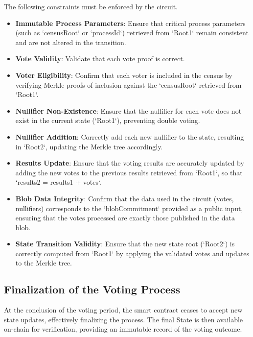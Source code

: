 \begin{figure}[H]
	\centering
\end{figure}

The following constraints must be enforced by the circuit.

\begin{itemize}
	\item \textbf{Immutable Process Parameters}: Ensure that critical process parameters (such as `censusRoot` or `processId`) retrieved from `Root1` remain consistent and are not altered in the transition.
	\item \textbf{Vote Validity}: Validate that each vote proof is correct.
	\item \textbf{Voter Eligibility}: Confirm that each voter is included in the census by verifying Merkle proofs of inclusion against the `censusRoot` retrieved from `Root1`.
	\item \textbf{Nullifier Non-Existence}: Ensure that the nullifier for each vote does not exist in the current state (`Root1`), preventing double voting.
	\item \textbf{Nullifier Addition}: Correctly add each new nullifier to the state, resulting in `Root2`, updating the Merkle tree accordingly.
	\item \textbf{Results Update}: Ensure that the voting results are accurately updated by adding the new votes to the previous results retrieved from `Root1`, so that `results2 = results1 + votes`.
	\item \textbf{Blob Data Integrity}: Confirm that the data used in the circuit (votes, nullifiers) corresponds to the `blobCommitment` provided as a public input, ensuring that the votes processed are exactly those published in the data blob.
	\item \textbf{State Transition Validity}: Ensure that the new state root (`Root2`) is correctly computed from `Root1` by applying the validated votes and updates to the Merkle tree.
\end{itemize}

\subsection{Finalization of the Voting Process}

At the conclusion of the voting period, the smart contract ceases to accept new state updates, effectively finalizing the process. The final State is then available on-chain for verification, providing an immutable record of the voting outcome.